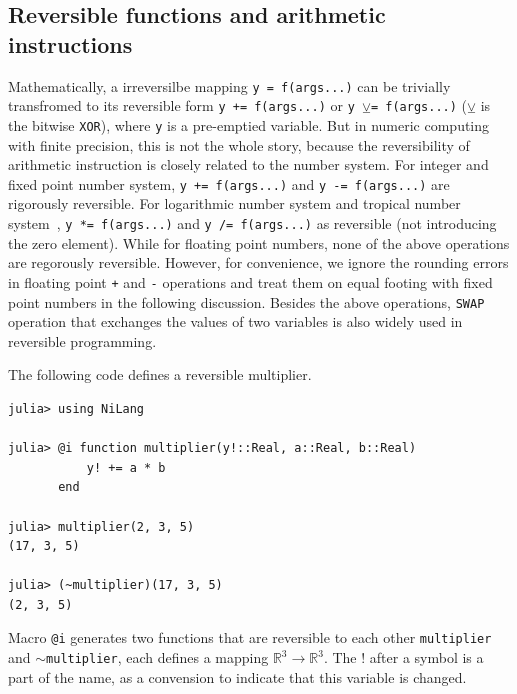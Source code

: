 \documentclass{article}
\newcommand{\<}{\langle}
\renewcommand{\>}{\rangle}
\theoremstyle{definition}\newtheorem{definition}{\textit{Definition}}
\begin{document}
\subsection{Reversible functions and arithmetic instructions}
    Mathematically, a irreversilbe mapping \texttt{y = f(args...)} can be trivially transfromed to its reversible form \texttt{y += f(args...)} or \texttt{y $\veebar$= f(args...)} ($\veebar$ is the bitwise \texttt{XOR}), where \texttt{y} is a pre-emptied variable. But in numeric computing with finite precision, this is not the whole story, because the reversibility of arithmetic instruction is closely related to the number system.
    For integer and fixed point number system, \texttt{y += f(args...)} and \texttt{y -= f(args...)} are rigorously reversible. For logarithmic number system and tropical number system~\cite{Speyer2009}, \texttt{y *= f(args...)} and \texttt{y /= f(args...)} as reversible (not introducing the zero element). While for floating point numbers, none of the above operations are regorously reversible. However, for convenience, we ignore the rounding errors in floating point \texttt{+} and \texttt{-} operations and treat them on equal footing with fixed point numbers in the following discussion.
Besides the above operations, \texttt{SWAP} operation that exchanges the values of two variables is also widely used in reversible programming.

The following code defines a reversible multiplier.

\begin{minipage}{.88\columnwidth}
\begin{lstlisting}[mathescape=true,caption={A reversible mutiplier},label={lst:mutiplier}]
julia> using NiLang

julia> @i function multiplier(y!::Real, a::Real, b::Real)
           y! += a * b
       end

julia> multiplier(2, 3, 5)
(17, 3, 5)

julia> (~multiplier)(17, 3, 5)
(2, 3, 5)
\end{lstlisting}
\end{minipage}

Macro \texttt{@i} generates two functions that are reversible to each other \texttt{multiplier} and \texttt{$\sim$multiplier}, each defines a mapping $\mathbb{R}^3 \rightarrow \mathbb{R}^3$. The $!$ after a symbol is a part of the name, as a convension to indicate that this variable is changed.
\end{document}
